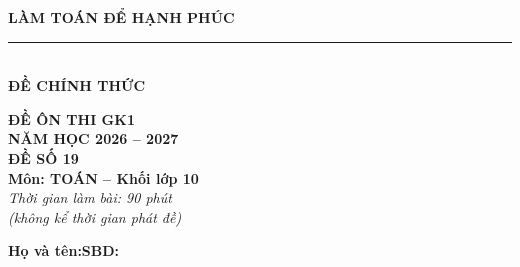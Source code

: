 \documentclass[12pt,a4paper]{article}
\begin{document}
\noindent
\begin{minipage}[c]{0.38\textwidth}
    \centering
    \textbf{LÀM TOÁN ĐỂ HẠNH PHÚC}\\[-2pt]
    \rule{3.2cm}{0.6pt}\\[4pt]
    \textbf{ĐỀ CHÍNH THỨC}
\end{minipage}\hfill
\begin{minipage}[c]{0.35\textwidth}
    \centering
    \textbf{ĐỀ ÔN THI GK1}\\
    \textbf{NĂM HỌC 2026 -- 2027}\\[2pt]
    \textbf{ĐỀ SỐ 19}\\
    \textbf{Môn: TOÁN -- Khối lớp 10}\\
    \textit{\small Thời gian làm bài: 90 phút\\(không kể thời gian phát đề)}
\end{minipage}

\vspace{0.1cm}
\noindent
\begin{minipage}[b]{0.78\textwidth}
    \textbf{Họ và tên:}\dotfill\textbf{SBD:}\makebox[3.5cm]{\dotfill}
\end{minipage}\hfill
\begin{minipage}[b]{0.20\textwidth}
    \hfill
    \setlength{\fboxrule}{0.8pt}%
\end{minipage}
\vspace{0.1cm}
\end{document}
